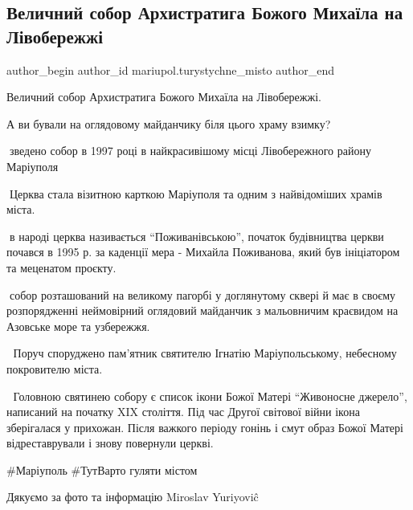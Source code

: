  
 
 
 
 

\subsection{Величний собор Архистратига Божого Михаїла на Лівобережжі}
\label{sec:28_12_2021.fb.mariupol.turystychne_misto.1.sobor_arhistratiga_mihaila_livoberezzhja}

\ifcmt
 author_begin
   author_id mariupol.turystychne_misto
 author_end
\fi

Величний собор Архистратига Божого Михаїла на Лівобережжі.

А ви бували на оглядовому майданчику біля цього храму взимку?

🔹зведено собор в 1997 році в найкрасивішому місці Лівобережного району Маріуполя 

🔹Церква стала візитною карткою Маріуполя та одним з найвідоміших храмів міста.

🔹в народі церква називається \enquote{Поживанівською}, початок будівництва церкви
почався в 1995 р. за каденції мера - Михайла Поживанова, який був ініціатором
та меценатом проєкту.

🔹собор розташований на великому пагорбі у доглянутому сквері й має в своєму
розпорядженні неймовірний оглядовий майданчик з мальовничим краєвидом на
Азовське море та узбережжя.

🔹 Поруч споруджено пам'ятник святителю Ігнатію Маріупольському, небесному покровителю міста. 

🔹 Головною святинею собору є список ікони Божої Матері \enquote{Живоносне джерело},
написаний на початку XIX століття. Під час Другої світової війни ікона
зберігалася у прихожан. Після важкого періоду гонінь і смут образ Божої Матері
відреставрували і знову повернули церкві.

\#Маріуполь \#ТутВарто гуляти містом

Дякуємо за фото та інформацію Miroslav Yuriyoviĉ
